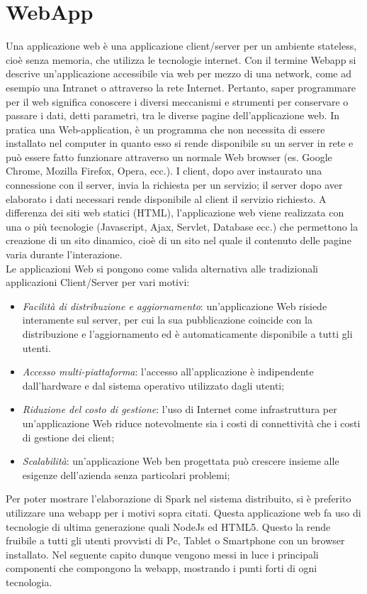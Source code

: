\section{WebApp}
\label{sec:webapp}
Una applicazione web è una applicazione client/server per un ambiente stateless, cioè senza memoria, che utilizza le tecnologie internet. Con il termine Webapp si descrive un'applicazione accessibile via web per mezzo di una network, come ad esempio una Intranet o attraverso la rete Internet. Pertanto, saper programmare per il web significa conoscere i diversi meccanismi e strumenti per conservare o passare i dati, detti parametri, tra le diverse pagine dell'applicazione web. In pratica una Web-application, è un programma che non necessita di essere installato nel computer in quanto esso si rende disponibile su un server in rete e può essere fatto funzionare attraverso un normale Web browser (es. Google Chrome, Mozilla Firefox, Opera, ecc.). I client, dopo aver instaurato una connessione con il server, invia la richiesta per un servizio; il server dopo aver elaborato i dati necessari rende disponibile al client il servizio richiesto. A differenza dei siti web statici (HTML), l'applicazione web viene realizzata con una o più tecnologie (Javascript, Ajax, Servlet, Database ecc.) che permettono la creazione di un sito dinamico, cioè di un sito nel quale il contenuto delle pagine varia durante l'interazione.
\\Le applicazioni Web si pongono come valida alternativa alle tradizionali applicazioni Client/Server per vari motivi:
\begin{itemize}
\item \textit{Facilità di distribuzione e aggiornamento}: un'applicazione Web risiede interamente sul server, per cui la sua pubblicazione coincide con la distribuzione e l'aggiornamento ed è automaticamente disponibile a tutti gli utenti.
\item \textit{Accesso multi-piattaforma}: l'accesso all'applicazione è indipendente dall'hardware e dal sistema operativo utilizzato dagli utenti;
\item \textit{Riduzione del costo di gestione}: l'uso di Internet come infrastruttura per un'applicazione Web riduce notevolmente sia i costi di connettività che i costi di gestione dei client;
\item \textit{Scalabilità}: un'applicazione Web ben progettata può crescere insieme alle esigenze dell'azienda senza particolari problemi;
\end{itemize}
Per poter mostrare l'elaborazione di Spark nel sistema distribuito, si è preferito utilizzare una webapp per i motivi sopra citati. Questa applicazione web fa uso di tecnologie di ultima generazione quali NodeJs ed HTML5. Questo la rende fruibile a tutti gli utenti provvisti di Pc, Tablet o Smartphone con un browser installato. Nel seguente capito dunque vengono messi in luce i principali componenti che compongono la webapp, mostrando i punti forti di ogni tecnologia.
